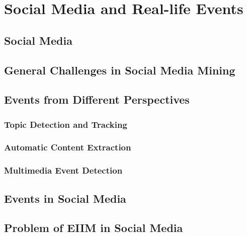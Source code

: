 
\chapter{Social Media and Real-life Events} %

\label{events} %


\section{Social Media}

\section{General Challenges in Social Media Mining}

\section{Events from Different Perspectives}

\subsection{Topic Detection and Tracking}

\subsection{Automatic Content Extraction}

\subsection{Multimedia Event Detection}

\section{Events in Social Media}

\section{Problem of EIIM in Social Media}